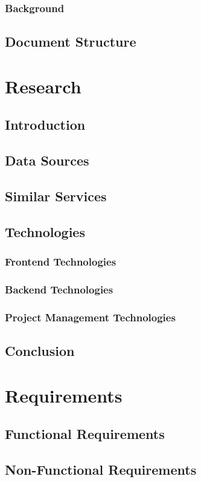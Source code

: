\documentclass[a4paper,11pt]{article}
\begin{document}
\subsubsection{Background}
\subsection{Document Structure}

\section{Research}
\subsection{Introduction}
\subsection{Data Sources}
\subsection{Similar Services}
\subsection{Technologies}
\subsubsection{Frontend Technologies}
\subsubsection{Backend Technologies}
\subsubsection{Project Management Technologies}
\subsection{Conclusion}

\section{Requirements}
\subsection{Functional Requirements}
\subsection{Non-Functional Requirements}
\end{document}
